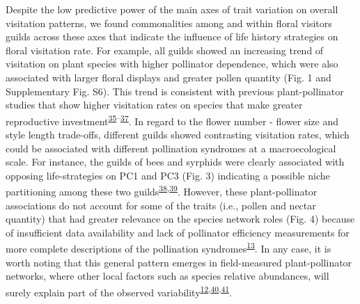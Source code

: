 \documentclass[12pt,a4paper,]{article}
\begin{document}
Despite the low predictive power of the main axes of trait variation on
overall visitation patterns, we found commonalities among and within
floral visitors guilds across these axes that indicate the influence of
life history strategies on floral visitation rate. For example, all
guilds showed an increasing trend of visitation on plant species with
higher pollinator dependence, which were also associated with larger
floral displays and greater pollen quantity (Fig. 1 and Supplementary
Fig. S6). This trend is consistent with previous plant-pollinator
studies that show higher visitation rates on species that make greater
reproductive
investment\textsuperscript{\protect\hyperlink{ref-hegland2005}{35}--\protect\hyperlink{ref-kaiser2014}{37}}.
In regard to the flower number - flower size and style length
trade-offs, different guilds showed contrasting visitation rates, which
could be associated with different pollination syndromes at a
macroecological scale. For instance, the guilds of bees and syrphids
were clearly associated with opposing life-strategies on PC1 and PC3
(Fig. 3) indicating a possible niche partitioning among these two
guilds\textsuperscript{\protect\hyperlink{ref-palmer2003}{38},\protect\hyperlink{ref-phillips2020}{39}}.
However, these plant-pollinator associations do not account for some of
the traits (i.e., pollen and nectar quantity) that had greater relevance
on the species network roles (Fig. 4) because of insufficient data
availability and lack of pollinator efficiency measurements for more
complete descriptions of the pollination
syndromes\textsuperscript{\protect\hyperlink{ref-dellinger2020}{13}}. In
any case, it is worth noting that this general pattern emerges in
field-measured plant-pollinator networks, where other local factors such
as species relative abundances, will surely explain part of the observed
variability\textsuperscript{\protect\hyperlink{ref-bartomeus2016}{12},\protect\hyperlink{ref-vazquez2007}{40},\protect\hyperlink{ref-encinas2012}{41}}.
\end{document}
